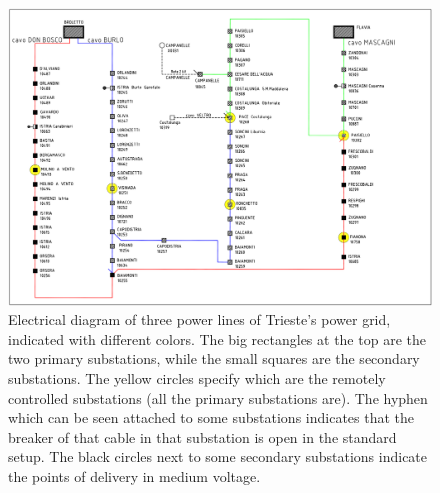 \begin{figure}[ph]
    \centering
    \includegraphics[scale=0.35, center]{chapters/figures/Mastrino.png}
    \caption{Electrical diagram of three power lines of Trieste's power grid, indicated with different colors. The big rectangles at the top are the two primary substations, while the small squares are the secondary substations. The yellow circles specify which are the remotely controlled substations (all the primary substations are). The hyphen which can be seen attached to some substations indicates that the breaker of that cable in that substation is open in the standard setup. The black circles next to some secondary substations indicate the points of delivery in medium voltage.}
    \label{fig:mastrino}
\end{figure}

